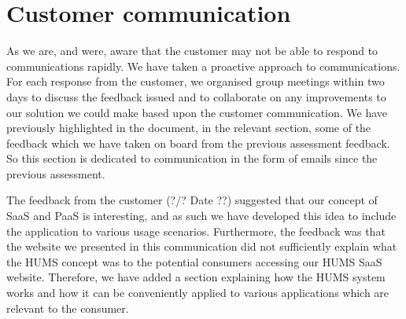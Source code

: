 \documentclass[10pt,a4paper]{article}
\begin{document}
\section{Customer communication}
As we are, and were, aware that the customer may not be able to respond to communications rapidly. We have taken a proactive approach to communications. For each response from the customer, we organised group meetings within two days to discuss the feedback issued and to collaborate on any improvements to our solution we could make based upon the customer communication. We have previously highlighted in the document, in the relevant section, some of the feedback which we have taken on board from the previous assessment feedback. So this section is dedicated to communication in the form of emails since the previous assessment.

The feedback from the customer (?/? Date ??) suggested that our concept of SaaS and PaaS is interesting, and as such we have developed this idea to include the application to various usage scenarios. Furthermore, the feedback was that the website we presented in this communication did not sufficiently explain what the HUMS concept was to the potential consumers accessing our HUMS SaaS website. Therefore, we have added a section explaining how the HUMS system works and how it can be conveniently applied to various applications which are relevant to the consumer.

\vfill


\end{document}
